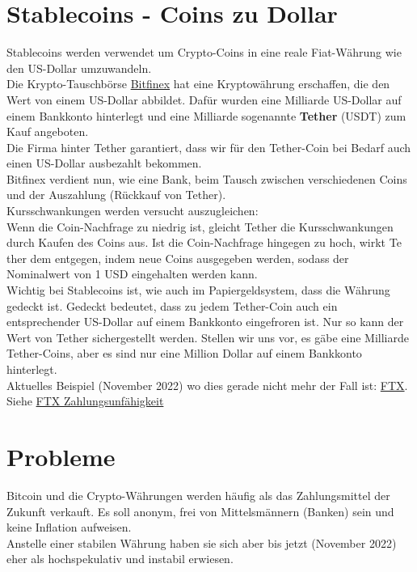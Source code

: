 \documentclass[10pt,a4paper,titlepage]{article}
\begin{document}
\section{Stablecoins - Coins zu Dollar}
Stablecoins werden verwendet um Crypto-Coins in eine reale Fiat-Währung wie den US-Dollar umzuwandeln.\\
Die Krypto-Tauschbörse \href{https://www.bitfinex.com/}{\color{blue}Bitfinex}
hat eine Kryptowährung erschaffen, die den Wert von einem US-Dollar abbildet.
Dafür wurden eine Milliarde US-Dollar auf einem Bankkonto hinterlegt und eine
Milliarde sogenannte \textbf{Tether} (USDT) zum Kauf angeboten.\\
Die Firma hinter Tether garantiert, dass wir für den Tether-Coin bei Bedarf auch einen US-Dollar ausbezahlt bekommen.\\
Bitfinex verdient nun, wie eine Bank, beim Tausch zwischen verschiedenen Coins und der Auszahlung (Rückkauf von Tether).\\
Kursschwankungen werden versucht auszugleichen:\\ 
Wenn die Coin-Nachfrage zu niedrig ist, gleicht Tether die Kursschwankungen
durch Kaufen des Coins aus. Ist die Coin-Nachfrage hingegen zu hoch, wirkt Te
ther dem entgegen, indem neue Coins ausgegeben werden, sodass der Nominalwert von 1 USD eingehalten werden kann.\vspace{.3cm}\\
Wichtig bei Stablecoins ist, wie auch im Papiergeldsystem, dass die Währung gedeckt ist. Gedeckt bedeutet, dass zu jedem Tether-Coin auch ein entsprechender US-Dollar auf einem Bankkonto eingefroren ist. Nur so kann der Wert von Tether sichergestellt werden. Stellen wir uns vor, es gäbe eine Milliarde Tether-Coins, aber es sind nur eine Million Dollar auf einem Bankkonto hinterlegt.\\
Aktuelles Beispiel (November 2022) wo dies gerade nicht mehr der Fall ist: \href{https://ftx.com/}{\color{blue}FTX}. Siehe \href{https://www.n-tv.de/wirtschaft/Bei-FTX-soll-mindestens-eine-Milliarde-Dollar-fehlen-article23713547.html}{\color{blue}FTX Zahlungsunfähigkeit}




\section{Probleme}
Bitcoin und die Crypto-Währungen werden häufig als das Zahlungsmittel der Zukunft verkauft. Es soll anonym, frei von Mittelsmännern (Banken) sein und keine Inflation aufweisen.\\
Anstelle einer stabilen Währung haben sie sich aber bis jetzt (November 2022) eher als hochspekulativ und instabil erwiesen.
\end{document}
